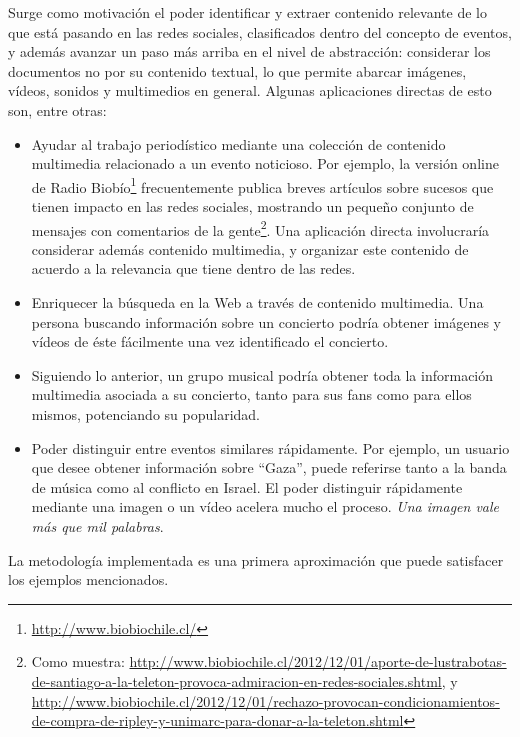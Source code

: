 \documentclass[upright, contnum]{umemoria}
\begin{document}
   Surge como motivación el poder identificar y extraer contenido
   relevante de lo que está pasando en las redes sociales,
   clasificados dentro del concepto de eventos, y además avanzar un
   paso más arriba en el nivel de abstracción: considerar los
   documentos no por su contenido textual, lo que permite abarcar
   imágenes, vídeos, sonidos y multimedios en general. Algunas
   aplicaciones directas de esto son, entre otras:

\begin{itemize}
\item Ayudar al trabajo periodístico mediante una colección de
     contenido multimedia relacionado a un evento noticioso. Por
     ejemplo, la versión online de Radio
     Biobío\footnote{\href{http://www.biobiochile.cl/}{http://www.biobiochile.cl/} } frecuentemente publica
     breves artículos sobre sucesos que tienen impacto en las redes
     sociales, mostrando un pequeño conjunto de mensajes con
     comentarios de la gente\footnote{Como muestra: \href{http://www.biobiochile.cl/2012/12/01/aporte-de-lustrabotas-de-santiago-a-la-teleton-provoca-admiracion-en-redes-sociales.shtml}{http://www.biobiochile.cl/2012/12/01/aporte-de-lustrabotas-de-santiago-a-la-teleton-provoca-admiracion-en-redes-sociales.shtml}, y \href{http://www.biobiochile.cl/2012/12/01/rechazo-provocan-condicionamientos-de-compra-de-ripley-y-unimarc-para-donar-a-la-teleton.shtml}{http://www.biobiochile.cl/2012/12/01/rechazo-provocan-condicionamientos-de-compra-de-ripley-y-unimarc-para-donar-a-la-teleton.shtml} }. 
     Una aplicación directa involucraría
     considerar además contenido multimedia, y organizar este
     contenido de acuerdo a la relevancia que tiene dentro de las
     redes.
\item Enriquecer la búsqueda en la Web a través de contenido
     multimedia. Una persona buscando información sobre un concierto
     podría obtener imágenes y vídeos de éste fácilmente una vez
     identificado el concierto.
\item Siguiendo lo anterior, un grupo musical podría obtener toda la
     información multimedia asociada a su concierto, tanto para sus
     fans como para ellos mismos, potenciando su popularidad.
\item Poder distinguir entre eventos similares rápidamente. Por
     ejemplo, un usuario que desee obtener información sobre ``Gaza'',
     puede referirse tanto a la banda de música como al conflicto en
     Israel. El poder distinguir rápidamente mediante una imagen o un
     vídeo acelera mucho el proceso. \emph{Una imagen vale más que mil palabras}.
\end{itemize}
   La metodología implementada es una primera aproximación que puede
   satisfacer los ejemplos mencionados.
\end{document}
